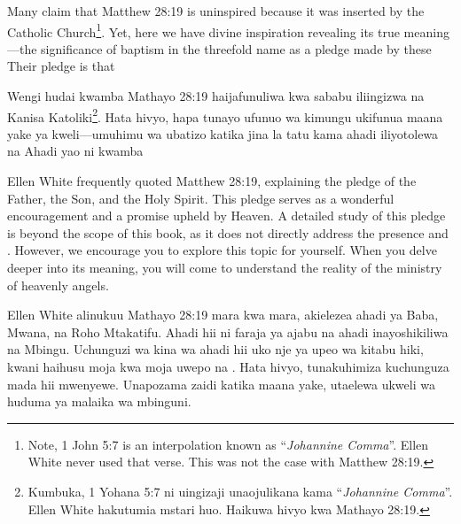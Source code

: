 Many claim that Matthew 28:19 is uninspired because it was inserted by the Catholic Church\footnote{Note, 1 John 5:7  is an interpolation known as “\textit{Johannine Comma}”. Ellen White never used that verse. This was not the case with Matthew 28:19.}. Yet, here we have divine inspiration revealing its true meaning—the significance of baptism in the threefold name as a pledge made by these  Their pledge is that 


Wengi hudai kwamba Mathayo 28:19 haijafunuliwa kwa sababu iliingizwa na Kanisa Katoliki\footnote{Kumbuka, 1 Yohana 5:7  ni uingizaji unaojulikana kama “\textit{Johannine Comma}”. Ellen White hakutumia mstari huo. Haikuwa hivyo kwa Mathayo 28:19.}. Hata hivyo, hapa tunayo ufunuo wa kimungu ukifunua maana yake ya kweli—umuhimu wa ubatizo katika jina la tatu kama ahadi iliyotolewa na  Ahadi yao ni kwamba 


Ellen White frequently quoted Matthew 28:19, explaining the pledge of the Father, the Son, and the Holy Spirit. This pledge serves as a wonderful encouragement and a promise upheld by Heaven. A detailed study of this pledge is beyond the scope of this book, as it does not directly address the presence and . However, we encourage you to explore this topic for yourself. When you delve deeper into its meaning, you will come to understand the reality of the ministry of heavenly angels.


Ellen White alinukuu Mathayo 28:19 mara kwa mara, akielezea ahadi ya Baba, Mwana, na Roho Mtakatifu. Ahadi hii ni faraja ya ajabu na ahadi inayoshikiliwa na Mbingu. Uchunguzi wa kina wa ahadi hii uko nje ya upeo wa kitabu hiki, kwani haihusu moja kwa moja uwepo na . Hata hivyo, tunakuhimiza kuchunguza mada hii mwenyewe. Unapozama zaidi katika maana yake, utaelewa ukweli wa huduma ya malaika wa mbinguni.


